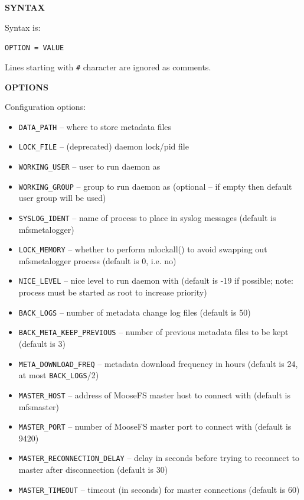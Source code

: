 \documentclass[a4paper,11pt,english]{report}
\def\code#1{\texttt{#1}}
\begin{document}
				\textbf{SYNTAX}
				
					Syntax is:

					\code{OPTION = VALUE}

					Lines starting with \code{\#} character are ignored as comments.
				\bigskip
				
				\textbf{OPTIONS}
				
				Configuration options:

				\begin{itemize}
					\item \code{DATA\_PATH} -- where to store metadata files

					\item \code{LOCK\_FILE} -- (deprecated) daemon lock/pid file

					\item \code{WORKING\_USER} -- user to run daemon as

					\item \code{WORKING\_GROUP} -- group to run daemon as (optional -- if empty  then  default  user group will be used)

					\item \code{SYSLOG\_IDENT} -- name of process to place in syslog messages (default is mfsmetalogger)

					\item \code{LOCK\_MEMORY} -- whether to perform mlockall() to avoid swapping out  mfsmetalogger process (default is 0, i.e. no)

					\item \code{NICE\_LEVEL} -- nice level to run daemon with (default is -19 if possible; note: process must be started as root to increase priority)

					\item \code{BACK\_LOGS} -- number of metadata change log files (default is 50)

					\item \code{BACK\_META\_KEEP\_PREVIOUS} -- number of previous metadata files to be kept (default is 3)

					\item \code{META\_DOWNLOAD\_FREQ} -- metadata download frequency in hours (default  is  24,  at  most \code{BACK\_LOGS}/2)

					\item \code{MASTER\_HOST} -- address  of MooseFS master host to connect with (default is mfsmaster)

					\item \code{MASTER\_PORT} -- number of MooseFS master port to connect with (default is 9420)

					\item \code{MASTER\_RECONNECTION\_DELAY} -- delay in seconds before trying to reconnect to master after disconnection (default is 30)

					\item \code{MASTER\_TIMEOUT} -- timeout (in seconds) for master connections (default is 60)
				\end{itemize}
			
\end{document}
